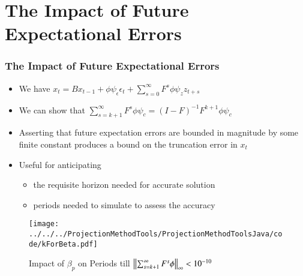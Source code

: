\documentclass{beamer}
\begin{document}
      \section{The Impact of Future Expectational Errors}

    \begin{frame}
      \frametitle{The Impact of Future Expectational Errors}
     
      \begin{itemize}
      	\item We have $
      		 x_{t} =B x_{t-1}+ \phi \psi_\epsilon\epsilon_t + \sum_{s=0}^\infty F^s \phi \psi_z z_{t+s}$ 
      	\item We can show that $\sum_{s=k+1}^{\infty} F^s \phi \psi_c = (I -F)^{-1} F^{k+1}\phi \psi_c$
      	\item Asserting that future expectation errors are bounded in magnitude by some finite  constant produces a bound on the truncation error in $x_t$
      	\item Useful for anticipating 
      	\begin{itemize}
       \item the requisite horizon needed for accurate solution
      	  \item periods needed to simulate to assess the accuracy
      	   	\end{itemize} 
      \end{itemize}
      \begin{figure}[H]
      	\caption{Impact of $\beta_p$ on Periods till $\left\lVert\sum_{s=k+1}^\infty F^s \phi\right\rVert_\infty<10^{-10}$}

\texttt{[image: ../../../ProjectionMethodTools/ProjectionMethodToolsJava/code/kForBeta.pdf]}  
      \end{figure}    
{\small

}
    \end{frame}
\end{document}
